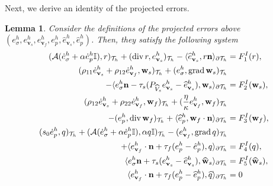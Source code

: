 \documentclass[10pt,letterpaper]{amsart}
\theoremstyle{plain} %
\newtheorem{lemma}[theorem]{Lemma} %
\theoremstyle{remark} %
\newcommand{\vect}[1]{\mathbf{#1}}
\newcommand{\divergence}{\mathrm{div}\,}
\newcommand{\grad}{\mathrm{grad}\,}
\newcommand{\Id}{\mathbb{I}} %
\newcommand{\Ael}{\mathcal{A}} %
\newcommand{\Thprod}[2]{( #1, #2 )_{\mathcal{T}_h}}
\newcommand{\pThprod}[2]{\langle #1, #2 \rangle_{\partial \mathcal{T}_{h}}}
\begin{document}
Next, we derive an identity of the projected errors.
\begin{lemma}\label{eq:interpolationerror_eqns}
	Consider the definitions of the projected errors above $(e_\sigma^h, e_{\vect{v}_s}^{h}, e_{\vect{v}_f}^{h}, e_{p}^{h}, \widehat{e}_{\vect{v}_s}^{h}, \widehat{e}_{p}^{h})$. Then, they satisfy the following system
	\begin{subequations}
		\label{eq:semidiscrete-reduced-error-eqs}
		\begin{align}
			\label{eq:semidiscrete-reduced-error-eq1}
			\Thprod{\Ael(\dot{e}_{\sigma}^{h} + \alpha \dot{e}_{p}^{h} \Id)}{r} +\Thprod{\divergence r}{e_{\vect{v}_{s}}^{h}} -\pThprod{\widehat{e}_{\vect{v}_{s}}^{h}}{r \vect{n}} 
			&=  F_1^{I}(r),
			\\ 
			\label{eq:semidiscrete-reduced-error-eq25}			\Thprod{\rho_{11}\dot{e}_{\vect{v}_{s}}^{h}+\rho_{12}\dot{e}_{\vect{v}_{f}}^{h}}{\vect{w}_{s}} + \Thprod{e_{\sigma}^{h}}{\grad \vect{w}_{s}} &
            \\
            \notag 
            - \pThprod{e_{\sigma}^{h} \vect{n} - \tau_{s} ({P_{\widehat{V}_s}}{e}_{\vect{v}_{s}}^{h} - \widehat{e}_{\vect{v}_{s}}^{h})}{\vect{w}_{s}} 
			&=F^{I}_2(\vect{w}_s), 
			\\
			\label{eq:semidiscrete-reduced-error-eq3}			\Thprod{\rho_{12}\dot{e}_{\vect{v}_{s}}^{h}+\rho_{22}\dot{e}_{\vect{v}_{f}}^{h}}{\vect{w}_{f}} + \Thprod{\frac{\eta}{\kappa} e_{\vect{v}_{f}}^{h}}{\vect{w}_{f}} &
            \\
            \notag 
            - \Thprod{e_{p}^{h} }{\divergence\vect{w}_{f}} +\pThprod{\widehat{e}_{p}^{h}}{\vect{w}_{f}\cdot\vect{n}} 
			& = F_{3}^{I}(\vect{w}_{f}), 
			\\
			\label{eq:semidiscrete-reduced-error-eq4}
			\Thprod{s_{0}\dot{e}_{p}^{h}}{q} + \Thprod{\Ael(\dot{e}_{\sigma}^{h}+\alpha \dot{e}_{p}^{h}\Id)}{\alpha q\Id} - \Thprod{e_{\vect{v}_{f}}^{h}}{\grad q} &
            \\
            \notag 
            + \pThprod{e_{\vect{v}_{f}}^{h}\cdot \vect{n} + \tau_f (e_p^{h} - \hat{e}_p^{h})}{q} 
			&  = F_{4}^{I}(q),
			\\
			\label{eq:semidiscrete-reduced-error-eq5}
			\pThprod{e_{\sigma}^{h} \vect{n} + \tau_{s}(e_{\vect{v}_s}^{h} - \widehat{e}_{\vect{v}_s}^{h})}{\widehat{\vect{w}}_s}&= F_5^{I}(\widehat{\vect{w}}_s),
			\\
			\label{eq:semidiscrete-reduced-error-eq6}
			\pThprod{e_{\vect{v}_{f}}^{h}\cdot \vect{n} + \tau_{f}(e_{p}^{h} - \widehat{e}_{p}^{h})}{\widehat{q}}& = 0 

\end{align}
\end{subequations}
\end{lemma}
\end{document}
